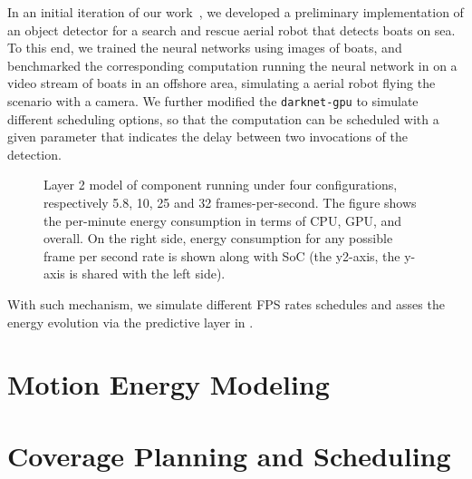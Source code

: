 In an initial iteration of our work~\citep{teamplayd43}, we developed a preliminary implementation of an object detector for a search and rescue aerial robot that detects boats on sea. To this end, we trained the neural networks using images of boats, and benchmarked the corresponding computation running the neural network in  on a video stream of boats in an offshore area, simulating a aerial robot flying the scenario with a camera. We further modified the {\small\tt darknet-gpu} to simulate different scheduling options, so that the computation can be scheduled with a given parameter that indicates the delay between two invocations of the detection. 
\begin{figure}[h!]
  \centering
  \selectfont
  
  \caption{Layer 2 model of  component running under four configurations, respectively 5.8, 10, 25 and 32 frames-per-second. The figure shows the per-minute energy consumption in terms of CPU, GPU, and overall. On the right side, energy consumption for any possible frame per second rate is shown along with SoC (the y2-axis, the y-axis is shared with the left side).}
  \label{fig:darknet-layer2}
\end{figure}
With such mechanism, we simulate different FPS rates schedules and asses the energy evolution via the predictive layer in .

\section{Motion Energy Modeling}
\label{sec:res-ene-mot}

\section{Coverage Planning and Scheduling}
\label{sec:res-dyn}




